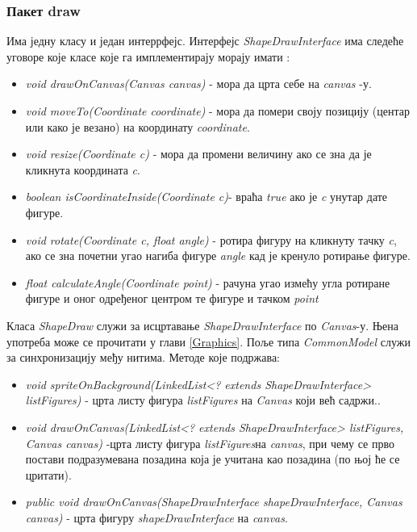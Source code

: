 \subsubsection{Пакет draw}
Има једну класу и један интеррфејс. 
Интерфејс \emph{ShapeDrawInterface} има следеће уговоре које класе које га имплементирају морају имати :
\begin{itemize}
\item \emph{void drawOnCanvas(Canvas canvas)} - мора да црта себе на \emph{canvas} -у.
\item \emph{void moveTo(Coordinate coordinate)} - мора да помери своју позицију (центар или како је везано) на координату \emph{coordinate}.
\item \emph{void resize(Coordinate c)} - мора да промени величину ако се зна да је кликнута координата \emph{c}.
\item \emph{boolean isCoordinateInside(Coordinate c)}- враћа \emph{true} ако је \emph{c} унутар дате фигуре.
\item \emph{void rotate(Coordinate c, float angle)}  - ротира фигуру на кликнуту тачку \emph{c}, ако се зна почетни угао нагиба фигуре  \emph{angle} кад је кренуло ротирање фигуре.  
\item \emph{float calculateAngle(Coordinate point)}  - рачуна угао измећу угла ротиране фигуре и оног одређеног центром те фигуре и тачком \emph{point}
\end{itemize}

Класа \emph{ShapeDraw} служи за исцртавање \emph{ShapeDrawInterface} по \emph{Canvas}-у. Њена употреба може се прочитати у глави \ref{Graphics}. Поље типа \emph{CommonModel} служи за синхронизацију међу нитима. Методе које подржава:
\begin{itemize}
\item \emph{void spriteOnBackground(LinkedList<? extends ShapeDrawInterface> listFigures)} - црта листу фигура \emph{listFigures} на \emph{Canvas} који већ садржи..
\item \emph{void drawOnCanvas(LinkedList<? extends ShapeDrawInterface> listFigures, Canvas canvas)} -црта листу фигура \emph{listFigures}на \emph{canvas}, при чему се прво постави подразумевана позадина која је учитана као позадина (по њој ће се цритати).
\item \emph{public void drawOnCanvas(ShapeDrawInterface shapeDrawInterface, Canvas canvas)} - црта фигуру \emph{shapeDrawInterface }на \emph{canvas}.
\end{itemize}

